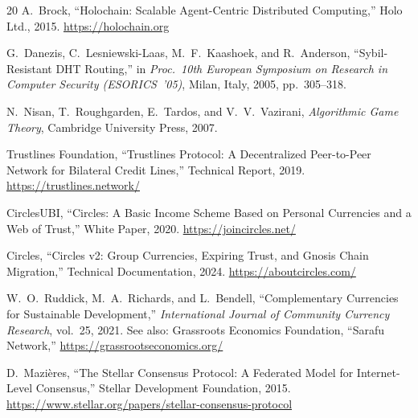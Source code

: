 \documentclass[11pt]{article}
\begin{document}
\begin{thebibliography}{20}
A.~Brock,
``Holochain: Scalable Agent-Centric Distributed Computing,''
Holo Ltd., 2015. \url{https://holochain.org}

G.~Danezis, C.~Lesniewski-Laas, M.~F.~Kaashoek, and R.~Anderson,
``Sybil-Resistant DHT Routing,''
in \emph{Proc.\ 10th European Symposium on Research in Computer Security (ESORICS~'05)},
Milan, Italy, 2005, pp.~305--318.

N.~Nisan, T.~Roughgarden, E.~Tardos, and V.~V.~Vazirani,
\emph{Algorithmic Game Theory},
Cambridge University Press, 2007.

Trustlines Foundation,
``Trustlines Protocol: A Decentralized Peer-to-Peer Network for Bilateral Credit Lines,''
Technical Report, 2019. \url{https://trustlines.network/}

CirclesUBI,
``Circles: A Basic Income Scheme Based on Personal Currencies and a Web of Trust,''
White Paper, 2020. \url{https://joincircles.net/}

Circles,
``Circles v2: Group Currencies, Expiring Trust, and Gnosis Chain Migration,''
Technical Documentation, 2024. \url{https://aboutcircles.com/}

W.~O.~Ruddick, M.~A.~Richards, and L.~Bendell,
``Complementary Currencies for Sustainable Development,''
\emph{International Journal of Community Currency Research}, vol.~25, 2021.
See also: Grassroots Economics Foundation, ``Sarafu Network,''
\url{https://grassrootseconomics.org/}

D.~Mazi\`{e}res,
``The Stellar Consensus Protocol: A Federated Model for Internet-Level Consensus,''
Stellar Development Foundation, 2015. \url{https://www.stellar.org/papers/stellar-consensus-protocol}

\end{thebibliography}
\end{document}
